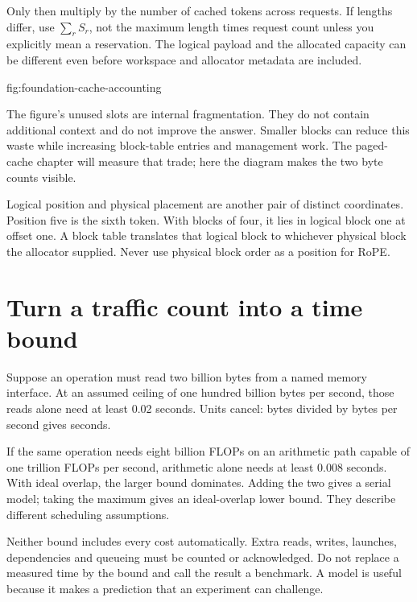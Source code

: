 Only then multiply by the number of cached tokens across requests.
If lengths differ, use $\sum_r S_r$, not the maximum length times
request count unless you explicitly mean a reservation. The logical
payload and the allocated capacity can be different even before
workspace and allocator metadata are included.

{fig:foundation-cache-accounting}

The figure's unused slots are internal fragmentation. They do not
contain additional context and do not improve the answer. Smaller
blocks can reduce this waste while increasing block-table entries
and management work. The paged-cache chapter will measure that trade;
here the diagram makes the two byte counts visible.

Logical position and physical placement are another pair of distinct
coordinates. Position five is the sixth token. With blocks of four,
it lies in logical block one at offset one. A block table translates
that logical block to whichever physical block the allocator supplied.
Never use physical block order as a position for RoPE.

\section{Turn a traffic count into a time bound}
Suppose an operation must read two billion bytes from a named memory
interface. At an assumed ceiling of one hundred billion bytes per
second, those reads alone need at least 0.02 seconds. Units cancel:
bytes divided by bytes per second gives seconds.

If the same operation needs eight billion FLOPs on an arithmetic path
capable of one trillion FLOPs per second, arithmetic alone needs at
least 0.008 seconds. With ideal overlap, the larger bound dominates.
Adding the two gives a serial model; taking the maximum gives an
ideal-overlap lower bound. They describe different scheduling assumptions.

Neither bound includes every cost automatically. Extra reads, writes,
launches, dependencies and queueing must be counted or acknowledged.
Do not replace a measured time by the bound and call the result a
benchmark. A model is useful because it makes a prediction that an
experiment can challenge.

